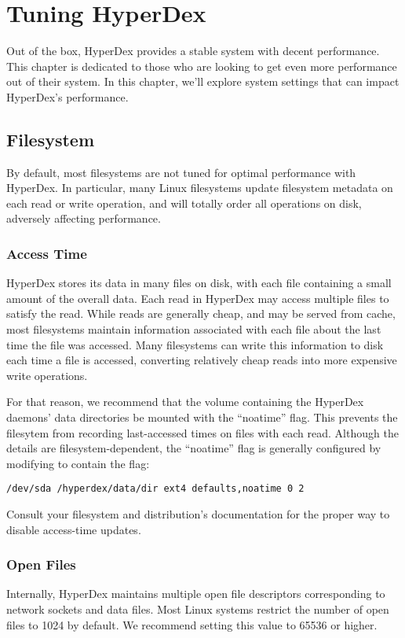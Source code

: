 \chapter{Tuning HyperDex}

Out of the box, HyperDex provides a stable system with decent performance.  This
chapter is dedicated to those who are looking to get even more performance out
of their system.  In this chapter, we'll explore system settings that can impact
HyperDex's performance.

\section{Filesystem}

By default, most filesystems are not tuned for optimal performance with
HyperDex.  In particular, many Linux filesystems update filesystem metadata
on each read or write operation, and will totally order all operations on disk,
adversely affecting performance.

\subsection{Access Time}

HyperDex stores its data in many files on disk, with each file containing a
small amount of the overall data.  Each read in HyperDex may access multiple
files to satisfy the read.  While reads are generally cheap, and may be served
from cache, most filesystems maintain information associated with each file
about the last time the file was accessed.  Many filesystems can write this
information to disk each time a file is accessed, converting relatively cheap
reads into more expensive write operations.

For that reason, we recommend that the volume containing the HyperDex daemons'
data directories be mounted with the ``noatime'' flag.  This prevents the
filesytem from recording last-accessed times on files with each read.  Although
the details are filesystem-dependent, the ``noatime'' flag is generally
configured by modifying  to contain the flag:

\begin{verbatim}
/dev/sda /hyperdex/data/dir ext4 defaults,noatime 0 2
\end{verbatim}

Consult your filesystem and distribution's documentation for the proper way to
disable access-time updates.

\subsection{Open Files}

Internally, HyperDex maintains multiple open file descriptors corresponding to
network sockets and data files.  Most Linux systems restrict the number of open
files to 1024 by default.  We recommend setting this value to 65536 or higher.
